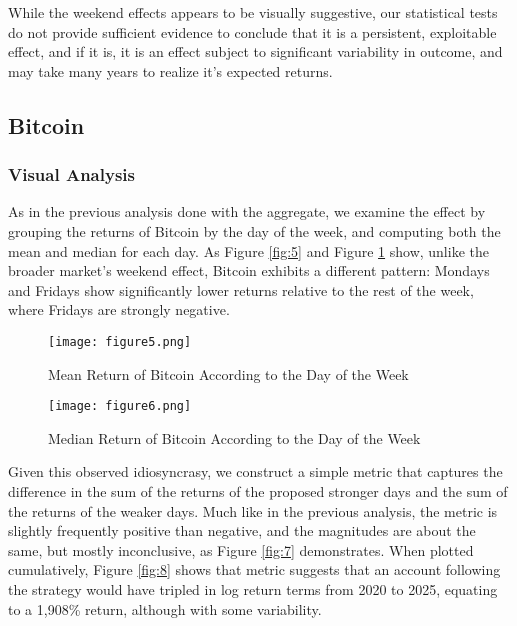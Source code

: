 \documentclass[
]{article}
\begin{document}
While the weekend effects appears to be visually suggestive, our
statistical tests do not provide sufficient evidence to conclude that it
is a persistent, exploitable effect, and if it is, it is an effect
subject to significant variability in outcome, and may take many years
to realize it's expected returns.

\subsection{Bitcoin}\label{bitcoin}

\subsubsection{Visual Analysis}\label{visual-analysis-1}

As in the previous analysis done with the aggregate, we examine the
effect by grouping the returns of Bitcoin by the day of the week, and
computing both the mean and median for each day. As Figure
\textcolor{blue}{\ref{fig:5}} and Figure \textcolor{blue}{\ref{fig:6}}
show, unlike the broader market's weekend effect, Bitcoin exhibits a
different pattern: Mondays and Fridays show significantly lower returns
relative to the rest of the week, where Fridays are strongly negative.

\begin{figure}[H]
    \centering
    \begin{minipage}{0.45\textwidth}
        \centering
        \texttt{[image: figure5.png]}
        \caption{Mean Return of Bitcoin According to the Day of the Week}
        \label{fig:5}
    \end{minipage}
    \hfill
    \begin{minipage}{0.45\textwidth}
        \centering
        \texttt{[image: figure6.png]}
        \caption{Median Return of Bitcoin According to the Day of the Week}
        \label{fig:6}
    \end{minipage}
\end{figure}

Given this observed idiosyncrasy, we construct a simple metric that
captures the difference in the sum of the returns of the proposed
stronger days and the sum of the returns of the weaker days. Much like
in the previous analysis, the metric is slightly frequently positive
than negative, and the magnitudes are about the same, but mostly
inconclusive, as Figure \textcolor{blue}{\ref{fig:7}} demonstrates. When
plotted cumulatively, Figure \textcolor{blue}{\ref{fig:8}} shows that
metric suggests that an account following the strategy would have
tripled in log return terms from 2020 to 2025, equating to a 1,908\%
return, although with some variability.
\end{document}
